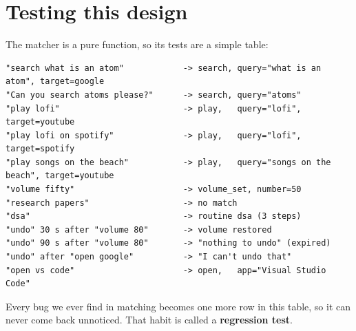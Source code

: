 \documentclass[11pt,a4paper]{article}
\begin{document}
\section{Testing this design}
The matcher is a pure function, so its tests are a simple table:

\begin{lstlisting}
"search what is an atom"            -> search, query="what is an atom", target=google
"Can you search atoms please?"      -> search, query="atoms"
"play lofi"                         -> play,   query="lofi",  target=youtube
"play lofi on spotify"              -> play,   query="lofi",  target=spotify
"play songs on the beach"           -> play,   query="songs on the beach", target=youtube
"volume fifty"                      -> volume_set, number=50
"research papers"                   -> no match
"dsa"                               -> routine dsa (3 steps)
"undo" 30 s after "volume 80"       -> volume restored
"undo" 90 s after "volume 80"       -> "nothing to undo" (expired)
"undo" after "open google"          -> "I can't undo that"
"open vs code"                      -> open,   app="Visual Studio Code"
\end{lstlisting}

\noindent Every bug we ever find in matching becomes one more row in this table, so it can never
come back unnoticed. That habit is called a \textbf{regression test}.

\end{document}
